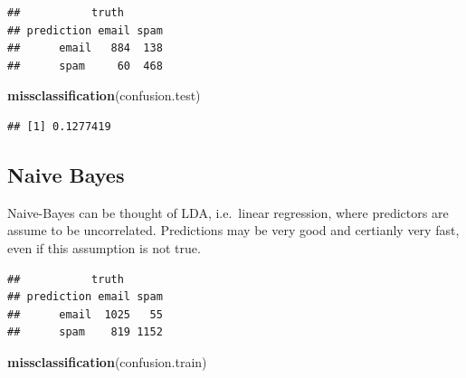 \documentclass[]{book}
\newenvironment{Shaded}{\begin{snugshade}}{\end{snugshade}}
\newcommand{\KeywordTok}[1]{\textcolor[rgb]{0.13,0.29,0.53}{\textbf{#1}}}
\newcommand{\DataTypeTok}[1]{\textcolor[rgb]{0.13,0.29,0.53}{#1}}
\newcommand{\DecValTok}[1]{\textcolor[rgb]{0.00,0.00,0.81}{#1}}
\newcommand{\StringTok}[1]{\textcolor[rgb]{0.31,0.60,0.02}{#1}}
\newcommand{\CommentTok}[1]{\textcolor[rgb]{0.56,0.35,0.01}{\textit{#1}}}
\newcommand{\OperatorTok}[1]{\textcolor[rgb]{0.81,0.36,0.00}{\textbf{#1}}}
\newcommand{\NormalTok}[1]{#1}
\theoremstyle{definition}
\theoremstyle{definition}
\theoremstyle{definition}
\theoremstyle{remark}
\begin{document}
\begin{verbatim}
##           truth
## prediction email spam
##      email   884  138
##      spam     60  468
\end{verbatim}

\begin{Shaded}
\begin{Highlighting}[]
\KeywordTok{missclassification}\NormalTok{(confusion.test)}
\end{Highlighting}
\end{Shaded}

\begin{verbatim}
## [1] 0.1277419
\end{verbatim}

\subsection{Naive Bayes}\label{naive-bayes}

Naive-Bayes can be thought of LDA, i.e.~linear regression, where
predictors are assume to be uncorrelated. Predictions may be very good
and certianly very fast, even if this assumption is not true.

\begin{Shaded}
\end{Shaded}

\begin{verbatim}
##           truth
## prediction email spam
##      email  1025   55
##      spam    819 1152
\end{verbatim}

\begin{Shaded}
\begin{Highlighting}[]
\KeywordTok{missclassification}\NormalTok{(confusion.train)}
\end{Highlighting}
\end{Shaded}
\end{document}
